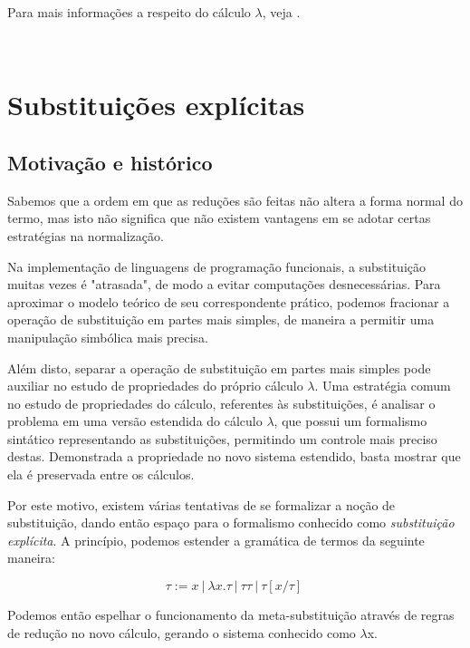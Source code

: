 Para mais informações a respeito do cálculo $\lambda$, veja \cite{barendregt}.

\



\section{Substituições explícitas}

\subsection{Motivação e histórico}

Sabemos que a ordem em que as reduções são feitas não altera a forma normal do
termo, mas isto não significa que não existem vantagens em se adotar certas
estratégias na normalização. 

Na implementação de linguagens de programação funcionais, a substituição muitas
vezes é "atrasada", de modo a evitar computações desnecessárias. Para aproximar
o modelo teórico de seu correspondente prático, podemos fracionar a operação de
substituição em partes mais simples, de maneira a permitir uma manipulação
simbólica mais precisa. \cite{levy1999}

Além disto, separar a operação de substituição em partes mais simples pode auxiliar
no estudo de propriedades do próprio cálculo $\lambda$. Uma estratégia comum
\cite{ben_cbv, ben_beta} no estudo de propriedades do cálculo, referentes às
substituições, é analisar o problema em uma versão estendida do cálculo
$\lambda$, que possui um formalismo sintático representando as substituições,
permitindo um controle mais preciso destas. Demonstrada a propriedade no novo
sistema estendido, basta mostrar que ela é preservada entre os cálculos.

Por este motivo, existem várias tentativas de se formalizar a noção de
substituição, dando então espaço para o formalismo conhecido como
\textit{substituição explícita}. A princípio, podemos estender a
gramática de termos da seguinte maneira:

\[ \tau := x\ |\ \lambda x.\tau\ |\ \tau \tau\ |\ \tau[x/\tau]\ \]

Podemos então espelhar o funcionamento da meta-substituição através de regras de
redução no novo cálculo, gerando o sistema conhecido como $\lambda$x.
\cite{lins86, rose92, bloo95}

